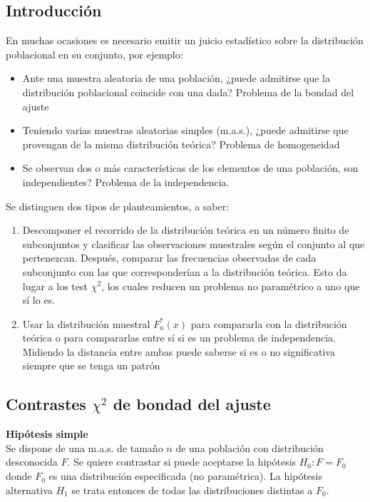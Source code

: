 \documentclass[a4paper,12pt]{article}
\begin{document}
\subsection{Introducción}
En muchas ocasiones es necesario emitir un juicio estadístico sobre la distribución poblacional en su conjunto, por ejemplo:
\begin{itemize}
\item Ante una muestra aleatoria de una población, ¿puede admitirse que la distribución poblacional coincide con una dada? Problema de la bondad del ajuste
\item Teniendo varias muestras aleatorias simples (m.a.s.), ¿puede admitirse que provengan de la misma distribución teórica? Problema de homogeneidad
\item Se observan dos o más características de los elementos de una población, son independientes? Problema de la independencia.
\end{itemize}

Se distinguen dos tipos de planteamientos, a saber:
\begin{enumerate}
    \item Descomponer el recorrido de la distribución teórica en un número finito de subconjuntos y clasificar las observaciones muestrales según el conjunto al que pertenezcan. Después, comparar las frecuencias observadas de cada subconjunto con las que corresponderían a la distribución teórica. Esto da lugar a los test $\chi^2$, los cuales reducen un problema no paramétrico a uno que sí lo es.
\item Usar la distribución muestral $F^*_n(x)$ para compararla con la distribución teórica o para compararlas entre sí si es un problema de independencia. Midiendo la distancia entre ambas puede saberse si es o no significativa siempre que se tenga un patrón
\end{enumerate}

\subsection{Contrastes $\chi^2$ de bondad del ajuste}
\textbf{Hipótesis simple} \\
Se dispone de una m.a.s. de tamaño $n$ de una población con distribución desconocida $F$. Se quiere contrastar si puede aceptarse la hipótesis $H_0 : F = F_0$ donde $F_0$ es una distribución especificada (no paramétrica). La hipótesis alternativa $H_1$ se trata entonces de todas las distribuciones distintas a $F_0$.
\end{document}
